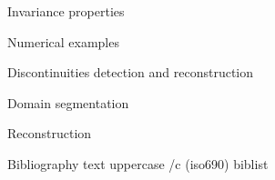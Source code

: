 \sec Invariance properties


\sec[numericalsec] Numerical examples


\chap Discontinuities detection\nl ^^J
      and reconstruction

\sec Domain segmentation

       

\sec Reconstruction

       












\def\_mtext#1{BIBLIOGRAPHY}
\let\uppercase\ignoreit
\nonum\chap Bibliography
\let\_mtext\omtext
\let\uppercase\_uppercase
\def\_opwarning#1{}
\usebib/c (iso690) biblist


\bye
